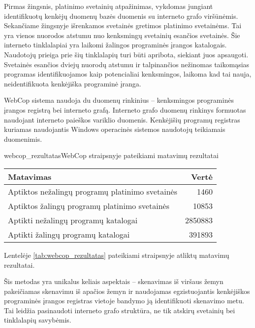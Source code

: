 Pirmas žingsnis, platinimo svetainių atpažinimas, vykdomas jungiant identifikuotų kenkėjų duomenų bazės duomenis su interneto grafo viršūnėmis. Sekančiame žingsnyje išrenkamos svetainės gretimos platinimo svetainėms. Tai yra vienos nuorodos atstumu nuo kenksmingų svetainių esančios svetainės. Šie interneto tinklalapiai yra laikomi žalingos programinės įrangos katalogais. Naudotojų prieiga prie šių tinklalapių turi būti apribota, siekiant juos apsaugoti. Svetainės esančios dviejų nuorodų atstumu ir talpinančios nežinomas taikomąsias programas identifikuojamos kaip potencialiai kenksmingos, laikoma kad tai nauja, neidentifikuota kenkėjiška programinė įranga.

WebCop sistema naudoja du duomenų rinkinius -- kenksmingos programinės įrangos registrą bei interneto grafą. Interneto grafo duomenų rinkinys formuotas naudojant interneto paieškos variklio duomenis. Kenkėjišių programų registras kuriamas naudojantis Windows operacinės sistemos naudotojų teikiamais duomenimis.

\begin{ktutable}{webcop_rezultatas}{WebCop straipsnyje pateikiami matavimų rezultatai}
    \begin{tabular}{| l | r |}
     \hline
        Matavimas & Vertė \\ \hline
        Aptiktos nežalingų programų platinimo svetainės & 1460 \\ \hline
        Aptiktos žalingų programų platinimo svetainės & 10853 \\ \hline
        Aptikti nežalingų programų katalogai & 2850883 \\ \hline
        Aptikti žalingų programų katalogai & 391893 \\ \hline
    \end{tabular}
\end{ktutable}

Lentelėje \vref{tab:webcop_rezultatas} pateikiami straipsnyje atliktų matavimų rezultatai.

Šis metodas yra unikalus keliais aspektais -- skenavimas iš viršaus žemyn pakeičiamas skenavimu iš apačios žemyn ir naudojamas egzistuojantis kenkėjiškos programinės įrangos registras vietoje bandymo ją identifikuoti skenavimo metu. Tai leidžia pasinaudoti interneto grafo struktūra, ne tik atskirų svetainių bei tinklalapių savybėmis.